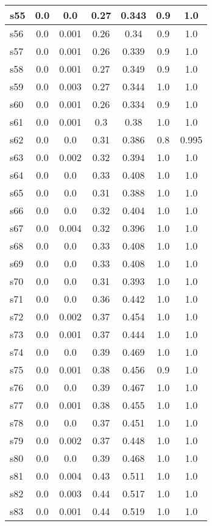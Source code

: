 \documentclass{article}
\begin{document}
\begin{tabular}{|l|c|c|c|c|c|c|}
s55 &0.0 & 0.0 & 0.27 & 0.343 & 0.9 & 1.0\\
\hline
s56 &0.0 & 0.001 & 0.26 & 0.34 & 0.9 & 1.0\\
\hline
s57 &0.0 & 0.001 & 0.26 & 0.339 & 0.9 & 1.0\\
\hline
s58 &0.0 & 0.001 & 0.27 & 0.349 & 0.9 & 1.0\\
\hline
s59 &0.0 & 0.003 & 0.27 & 0.344 & 1.0 & 1.0\\
\hline
s60 &0.0 & 0.001 & 0.26 & 0.334 & 0.9 & 1.0\\
\hline
s61 &0.0 & 0.001 & 0.3 & 0.38 & 1.0 & 1.0\\
\hline
s62 &0.0 & 0.0 & 0.31 & 0.386 & 0.8 & 0.995\\
\hline
s63 &0.0 & 0.002 & 0.32 & 0.394 & 1.0 & 1.0\\
\hline
s64 &0.0 & 0.0 & 0.33 & 0.408 & 1.0 & 1.0\\
\hline
s65 &0.0 & 0.0 & 0.31 & 0.388 & 1.0 & 1.0\\
\hline
s66 &0.0 & 0.0 & 0.32 & 0.404 & 1.0 & 1.0\\
\hline
s67 &0.0 & 0.004 & 0.32 & 0.396 & 1.0 & 1.0\\
\hline
s68 &0.0 & 0.0 & 0.33 & 0.408 & 1.0 & 1.0\\
\hline
s69 &0.0 & 0.0 & 0.33 & 0.408 & 1.0 & 1.0\\
\hline
s70 &0.0 & 0.0 & 0.31 & 0.393 & 1.0 & 1.0\\
\hline
s71 &0.0 & 0.0 & 0.36 & 0.442 & 1.0 & 1.0\\
\hline
s72 &0.0 & 0.002 & 0.37 & 0.454 & 1.0 & 1.0\\
\hline
s73 &0.0 & 0.001 & 0.37 & 0.444 & 1.0 & 1.0\\
\hline
s74 &0.0 & 0.0 & 0.39 & 0.469 & 1.0 & 1.0\\
\hline
s75 &0.0 & 0.001 & 0.38 & 0.456 & 0.9 & 1.0\\
\hline
s76 &0.0 & 0.0 & 0.39 & 0.467 & 1.0 & 1.0\\
\hline
s77 &0.0 & 0.001 & 0.38 & 0.455 & 1.0 & 1.0\\
\hline
s78 &0.0 & 0.0 & 0.37 & 0.451 & 1.0 & 1.0\\
\hline
s79 &0.0 & 0.002 & 0.37 & 0.448 & 1.0 & 1.0\\
\hline
s80 &0.0 & 0.0 & 0.39 & 0.468 & 1.0 & 1.0\\
\hline
s81 &0.0 & 0.004 & 0.43 & 0.511 & 1.0 & 1.0\\
\hline
s82 &0.0 & 0.003 & 0.44 & 0.517 & 1.0 & 1.0\\
\hline
s83 &0.0 & 0.001 & 0.44 & 0.519 & 1.0 & 1.0\\

\end{tabular}
\end{document}
